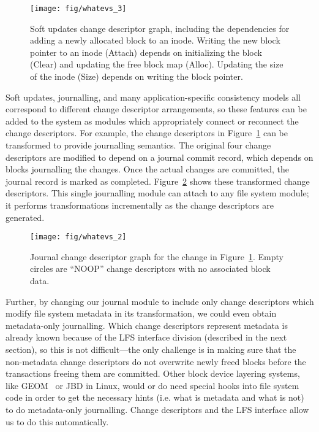 \begin{figure}[b]
  \centering
  \texttt{[image: fig/whatevs\_3]}%
  \caption{\label{fig:softupdates} Soft updates change descriptor graph,
  including the dependencies for adding a newly allocated block to an
  inode. Writing the new block pointer to an inode (Attach) depends on
  initializing the block (Clear) and updating the free block map (Alloc).
  Updating the size of the inode (Size) depends on writing the block
  pointer.}
\end{figure}

Soft updates, journalling, and many application-specific consistency models all
correspond to different change descriptor arrangements, so these features can be
added to the system as modules which appropriately connect or reconnect the
change descriptors.
%
For example, the change descriptors in Figure~\ref{fig:softupdates} can be
transformed to provide journalling semantics. The original four change
descriptors are modified to depend on a journal commit record, which
depends on blocks journalling the changes. Once the actual changes are
committed, the journal record is marked as completed.
Figure~\ref{fig:journal} shows these transformed change descriptors.
%
This single journalling module can attach to any file system module;
it performs transformations incrementally as the change descriptors
are generated.

\begin{figure}
  \centering
  \texttt{[image: fig/whatevs\_2]}%
  \caption{\label{fig:journal} Journal change descriptor graph for the
    change in Figure~\ref{fig:softupdates}. Empty circles are
    ``NOOP'' change descriptors with no associated block data.}
\end{figure}

Further, by changing our journal module to include only change descriptors which
modify file system metadata in its transformation, we could even obtain
metadata-only journalling. Which change descriptors represent metadata is
already known because of the LFS interface division (described in the next
section), so this is not difficult---the only challenge is in making sure that
the non-metadata change descriptors do not overwrite newly freed blocks before
the transactions freeing them are committed. Other block device layering
systems, like GEOM~\cite{geom} or JBD in Linux, would or do need special hooks
into file system code in order to get the necessary hints (i.e.  what is
metadata and what is not) to do metadata-only journalling. Change descriptors
and the LFS interface allow us to do this automatically.
